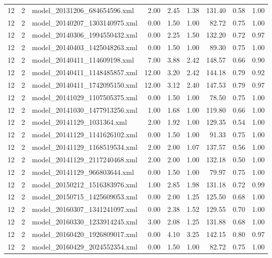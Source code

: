\begin{table}[ht]
\begin{tabular}{rrlrrrrrr}
   12 &   2 & model\_20131206\_684654596.xml & 2.00 & 2.45 & 1.38 & 131.40 & 0.58 & 1.00 \\ 
   12 &   2 & model\_20140207\_1303140975.xml & 0.00 & 1.50 & 1.00 & 82.72 & 0.75 & 1.00 \\ 
   12 &   2 & model\_20140306\_1994550432.xml & 0.00 & 2.25 & 1.50 & 132.20 & 0.72 & 0.97 \\ 
   12 &   2 & model\_20140403\_1425048263.xml & 0.00 & 1.50 & 1.00 & 89.30 & 0.75 & 1.00 \\ 
   12 &   2 & model\_20140411\_114609198.xml & 7.00 & 3.88 & 2.42 & 148.57 & 0.66 & 0.90 \\ 
   12 &   2 & model\_20140411\_1148485857.xml & 12.00 & 3.20 & 2.42 & 144.18 & 0.79 & 0.92 \\ 
   12 &   2 & model\_20140411\_1742095150.xml & 12.00 & 3.12 & 2.40 & 147.53 & 0.79 & 0.97 \\ 
   12 &   2 & model\_20141029\_1107505375.xml & 0.00 & 1.50 & 1.00 & 78.50 & 0.75 & 1.00 \\ 
   12 &   2 & model\_20141030\_1477913256.xml & 1.00 & 1.68 & 1.00 & 119.80 & 0.66 & 1.00 \\ 
   12 &   2 & model\_20141129\_1031364.xml & 2.00 & 1.92 & 1.00 & 129.35 & 0.54 & 1.00 \\ 
   12 &   2 & model\_20141129\_1141626102.xml & 0.00 & 1.50 & 1.00 & 91.33 & 0.75 & 1.00 \\ 
   12 &   2 & model\_20141129\_1168519534.xml & 2.00 & 2.00 & 1.07 & 137.57 & 0.56 & 1.00 \\ 
   12 &   2 & model\_20141129\_2117240468.xml & 2.00 & 2.00 & 1.00 & 132.18 & 0.50 & 1.00 \\ 
   12 &   2 & model\_20141129\_966803644.xml & 0.00 & 1.50 & 1.00 & 79.97 & 0.75 & 1.00 \\ 
   12 &   2 & model\_20150212\_1516383976.xml & 1.00 & 2.85 & 1.98 & 131.18 & 0.72 & 0.99 \\ 
   12 &   2 & model\_20150715\_1425609053.xml & 0.00 & 2.00 & 1.25 & 125.50 & 0.68 & 1.00 \\ 
   12 &   2 & model\_20160307\_1341241097.xml & 0.00 & 2.38 & 1.52 & 129.55 & 0.70 & 1.00 \\ 
   12 &   2 & model\_20160330\_1233914245.xml & 3.00 & 2.08 & 1.25 & 131.88 & 0.68 & 1.00 \\ 
   12 &   2 & model\_20160420\_1926809017.xml & 0.00 & 4.10 & 3.25 & 142.15 & 0.80 & 0.97 \\ 
   12 &   2 & model\_20160429\_2024552354.xml & 0.00 & 1.50 & 1.00 & 82.72 & 0.75 & 1.00 \\ 

\end{tabular}
\end{table}
